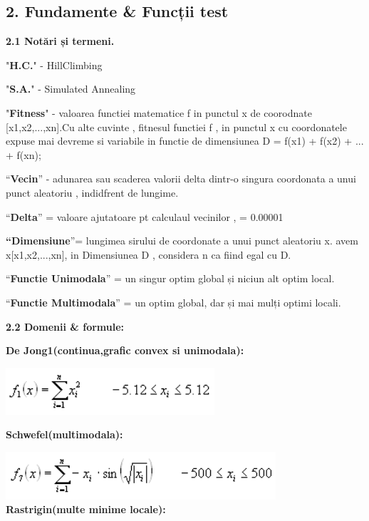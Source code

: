 \documentclass[
]{article}
\begin{document}
\hypertarget{fundamente-funcux21bii-test}{%
\subsection{\texorpdfstring{2. Fundamente \& Funcții test
}{2. Fundamente \& Funcții test }}\label{fundamente-funcux21bii-test}}

\textbf{2.1 Notări și termeni.}

"\textbf{H.C.}" - HillClimbing

"\textbf{S.A.}" - Simulated Annealing

"\textbf{Fitness}" - valoarea functiei matematice f in punctul x de
coorodnate {[}x1,x2,...,xn{]}.Cu alte cuvinte , fitnesul functiei f , in
punctul x cu coordonatele expuse mai devreme si variabile in functie de
dimensiunea D = f(x1) + f(x2) + ... + f(xn);

``\textbf{Vecin}'' - adunarea sau scaderea valorii delta dintr-o singura
coordonata a unui punct aleatoriu , indidfrent de lungime.

``\textbf{Delta}'' = valoare ajutatoare pt calculaul vecinilor , =
0.00001

\textbf{``Dimensiune}''= lungimea sirului de coordonate a unui punct
aleatoriu x. avem x{[}x1,x2,...,xn{]}, in Dimensiunea D , considera n ca
fiind egal cu D.

``\textbf{Functie Unimodala}'' = un singur optim global și niciun alt
optim local.

``\textbf{Functie Multimodala}'' = un optim global, dar și mai mulți
optimi locali.

\textbf{2.2 Domenii \& formule:}

\textbf{De Jong1(continua,grafic convex si unimodala):}

\includegraphics[width=3.05251in,height=0.6876in]{vertopal_3cc9e404d6084a9aa4179e4b559e5481/media/image1.png}

\textbf{Schwefel(multimodala):}

\includegraphics[width=3.94847in,height=0.69801in]{vertopal_3cc9e404d6084a9aa4179e4b559e5481/media/image2.png}\\
\textbf{Rastrigin(multe minime locale):}
\end{document}
